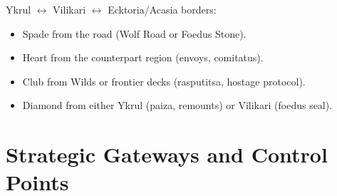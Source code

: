 Ykrul $\leftrightarrow$ Vilikari $\leftrightarrow$ Ecktoria/Acasia borders:
\begin{itemize}
\item Spade from the road (Wolf Road or Foedus Stone).
\item Heart from the counterpart region (envoys, comitatus).
\item Club from Wilds or frontier decks (rasputitsa, hostage protocol).
\item Diamond from either Ykrul (paiza, remounts) or Vilikari (foedus seal).
\end{itemize}

\section{Strategic Gateways and Control Points}
\label{sec:gateways}

